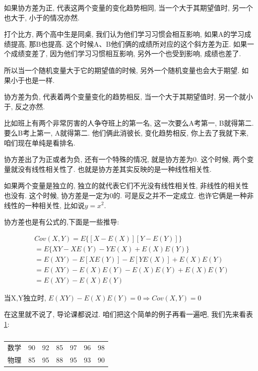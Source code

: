如果协方差为正, 代表这两个变量的变化趋势相同, 当一个大于其期望值时, 另一个也大于, 小于的情况亦然. 

打个比方, 两个高中生是同桌, 我们认为他们学习习惯会相互影响, 如果A的学习成绩提高, 那B也提高. 这个时候A、B他们俩的成绩所对应的这个斜方差为正. 如果一个成绩变差了, 因为他们学习习惯相互影响, 另外一个也受到影响, 成绩也差了. 

所以当一个随机变量大于它的期望值的时候, 另外一个随机变量也会大于期望. 如果小于也是一样. 

协方差为负, 代表着两个变量变化的趋势相反, 当一个大于其期望值时, 另一个就小于, 反之亦然. 

比如班上有两个非常厉害的人争夺班上的第一名, 这一次要么A考第一, B就得第二. 要么B考上第一, A就得第二. 他们俩此消彼长, 变化趋势相反, 你上去了我就下来, 咱们现在单纯是看排名. 

协方差出了为正或者为负, 还有一个特殊的情况, 就是协方差为0. 这个时候, 两个变量就没有线性相关性了. 也就是协方差其实反映的是一种线性相关性. 

如果两个变量是独立的, 独立的就代表它们不光没有线性相关性, 非线性的相关性也没有. 这个时候, 协方差是一定为0的. 可是反之并不一定成立. 也许它俩是一种非线性的一种相关性, 比如说$y=x^2$. 

协方差也是有公式的,下面是一些推导: 

\begin{align*}
  & Cov(X,Y)=E\{[X - E(X)][Y - E(Y)]\} \\
  & = E\{XY-XE(Y)-YE(X)+E(X)E(Y)\} \\
  & = E(XY)-E[XE(Y)]-E[YE(X)]+E(X)E(Y) \\
  & = E(XY)-E(X)E(Y)-E(X)E(Y)+E(X)E(Y) \\
  & = E(XY)-E(X)E(Y)
\end{align*}

当X,Y独立时, $E(XY)-E(X)E(Y) = 0 \Rightarrow Cov(X,Y) = 0$

在这里就不说了, 导论课都说过. 咱们把这个简单的例子再看一遍吧, 我们先来看表\ref{tab:table22_2}: 

\begin{table}[ht]
  \centering
  \begin{tabular}{lllllll}
    \midrule
      数学 & 90   & 92   & 85   & 97   & 96   & 98  \\
      物理 & 85   & 95   & 88   & 95   & 93   & 90   \\
    \bottomrule
  \end{tabular}
  \caption{}
  \label{tab:table22_2}
\end{table}

